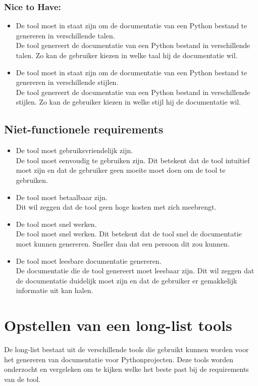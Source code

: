 \subsubsection{Nice to Have:}
\begin{itemize}
    \item De tool moet in staat zijn om de documentatie van een Python bestand te genereren in verschillende talen.\\
    De tool genereert de documentatie van een Python bestand in verschillende talen. Zo kan de gebruiker kiezen in welke taal hij de documentatie wil.
    \item De tool moet in staat zijn om de documentatie van een Python bestand te genereren in verschillende stijlen.\\
    De tool genereert de documentatie van een Python bestand in verschillende stijlen. Zo kan de gebruiker kiezen in welke stijl hij de documentatie wil.
\end{itemize}

\subsection{Niet-functionele requirements}
\label{sec:niet-functionele-requirements}
\begin{itemize}
    \item De tool moet gebruiksvriendelijk zijn.\\
    De tool moet eenvoudig te gebruiken zijn. Dit betekent dat de tool intuïtief moet zijn en dat de gebruiker geen moeite moet doen om de tool te gebruiken.
    \item De tool moet betaalbaar zijn.\\
    Dit wil zeggen dat de tool geen hoge kosten met zich meebrengt.
    \item De tool moet snel werken.\\
    De tool moet snel werken. Dit betekent dat de tool snel de documentatie moet kunnen genereren. Sneller dan dat een persoon dit zou kunnen.
    \item De tool moet leesbare documentatie genereren.\\
    De documentatie die de tool genereert moet leesbaar zijn. Dit wil zeggen dat de documentatie duidelijk moet zijn en dat de gebruiker er gemakkelijk informatie uit kan halen.    
\end{itemize}

\section{Opstellen van een long-list tools}
\label{sec:long-list}
De long-list bestaat uit de verschillende tools die gebruikt kunnen worden voor het genereren van documentatie voor Pythonprojecten.
Deze tools worden onderzocht en vergeleken om te kijken welke het beste past bij de requirements van de tool.

